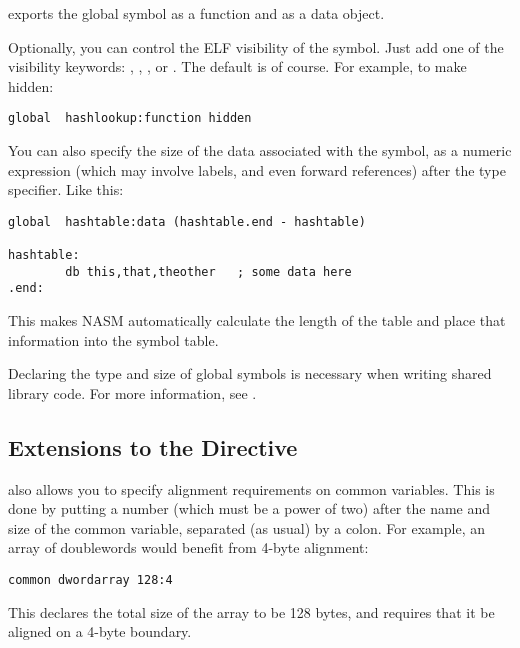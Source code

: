 exports the global symbol  as a function and
 as a data object.

Optionally, you can control the ELF visibility of the symbol. Just
add one of the visibility keywords: ,
, , or .
The default is  of course. For example, to make
 hidden:

\begin{lstlisting}
global  hashlookup:function hidden
\end{lstlisting}

You can also specify the size of the data associated with the
symbol, as a numeric expression (which may involve labels, and even
forward references) after the type specifier. Like this:

\begin{lstlisting}
global  hashtable:data (hashtable.end - hashtable)

hashtable:
        db this,that,theother   ; some data here
.end:
\end{lstlisting}

This makes NASM automatically calculate the length of the table and
place that information into the  symbol table.

Declaring the type and size of global symbols is necessary when
writing shared library code. For more information, see
.

\subsection{ Extensions to the  Directive}
\label{subsec:elfcomm}

 also allows you to specify alignment requirements
 on common variables.
This is done by putting a number (which must be a power of two)
after the name and size of the common variable, separated (as usual)
by a colon. For example, an array of doublewords would benefit from
4-byte alignment:

\begin{lstlisting}
common dwordarray 128:4
\end{lstlisting}

This declares the total size of the array to be 128 bytes, and
requires that it be aligned on a 4-byte boundary.

